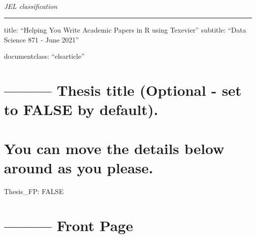 \documentclass[preprint, authoryear]{article}
\numberwithin{equation}{section}
\numberwithin{figure}{section}
\numberwithin{table}{section}
\begin{document}
\begin{frontmatter}  %

\title{}



\vspace{1cm}

\begin{keyword}
\footnotesize{
 \\ \vspace{0.3cm}
\textit{JEL classification} 
}
\end{keyword}
\vspace{0.5cm}
\end{frontmatter}



\pagestyle{fancy}
\chead{}
\rhead{}
\lfoot{}
\rfoot{}
\lhead{}
\cfoot{}


\headsep 35pt %




\begin{center}\rule{0.5\linewidth}{0.5pt}\end{center}

title: ``Helping You Write Academic Papers in R using Texevier''
subtitle: ``Data Science 871 - June 2021''

documentclass: ``elsarticle''

\hypertarget{thesis-title-optional---set-to-false-by-default.}{%
\section{--------- Thesis title (Optional - set to FALSE by
default).}\label{thesis-title-optional---set-to-false-by-default.}}

\hypertarget{you-can-move-the-details-below-around-as-you-please.}{%
\section{You can move the details below around as you
please.}\label{you-can-move-the-details-below-around-as-you-please.}}

Thesis\_FP: FALSE

\hypertarget{front-page}{%
\section{--------- Front Page}\label{front-page}}
\end{document}
